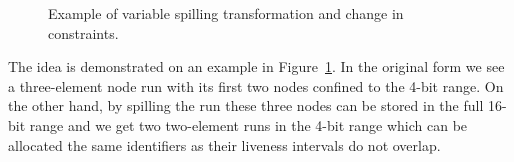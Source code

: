 \documentclass[12pt,twoside,notitlepage]{report}
\begin{document}
\begin{figure}

	\caption{Example of variable spilling transformation and change in constraints.}
	\label{figure:Reassembling_VariableSpilling}
\end{figure}

The idea is demonstrated on an example in Figure~\ref{figure:Reassembling_VariableSpilling}. In the original form we see a three-element node run with its first two nodes confined to the 4-bit range. On the other hand, by spilling the run these three nodes can be stored in the full 16-bit range and we get two two-element runs in the 4-bit range which can be allocated the same identifiers as their liveness intervals do not overlap.
\end{document}
